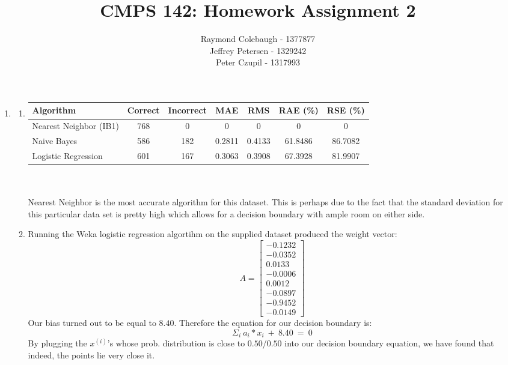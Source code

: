 \documentclass{article}
\title{CMPS 142: Homework Assignment 2}
\author{Raymond Colebaugh - 1377877\\Jeffrey Petersen - 1329242\\Peter Czupil - 1317993}
\begin{document}
\maketitle
\begin{enumerate}
        \item 
            \begin{enumerate}
                \item
                    \begin{tabular}{l | c c c c c c}
                        Algorithm      & Correct & Incorrect & MAE & RMS & RAE (\%) & RSE (\%)\\
                        \hline
                        Nearest Neighbor (IB1) & 768 & 0   & 0      & 0      & 0 & 0 \\
                        Naive Bayes            & 586 & 182 & 0.2811 & 0.4133 & 61.8486 & 86.7082 \\
                        Logistic Regression    & 601 & 167 & 0.3063 & 0.3908 & 67.3928 & 81.9907
                    \end{tabular}\\\\
                    Nearest Neighbor is the most accurate algorithm for this dataset. This is perhaps due to 			 the fact that the standard deviation for this particular data set is pretty high which 				 allows for a decision boundary with ample room on either side. 
                \item 
                   Running the Weka logistic regression algortihm on the supplied dataset produced the 				weight vector:
		$$
     			A=\begin{bmatrix}
         				-0.1232 \\
         				-0.0352 \\
        				0.0133 \\
         				-0.0006 \\
				0.0012 \\
				-0.0897 \\
				-0.9452 \\
				-0.0149
       			 \end{bmatrix}
  		$$
		Our bias turned out to be equal to $8.40$. Therefore the equation for our decision 				boundary is: 
		$$\Sigma_i \ a_i * x_i \ + \ 8.40\ = \ 0$$
		By plugging the $x^{(i)}$'s whose prob. distribution is close to $0.50$/$0.50$ into our 				decision boundary equation, we have found that indeed, the points lie very close it.   
	     \\\\

\end{enumerate}
\end{enumerate}
\end{document}
